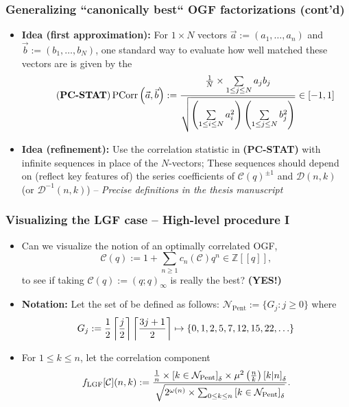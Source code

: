 \begin{frame}
\frametitle{Generalizing ``canonically best`` OGF factorizations (cont'd)}

\small
\begin{itemize} 

\item \textbf{Idea (first approximation):} For $1 \times N$ vectors $\vec{a} := (a_1, \ldots, a_n)$ and 
      $\vec{b} := (b_1, \ldots, b_N)$, one standard way to evaluate how well matched 
      these vectors are is given by the  
      \[
      \tag{\textbf{PC-STAT}}
      \operatorname{PCorr}\left(\vec{a}, \vec{b}\right) := 
           \frac{\frac{1}{N} \times \sum\limits_{1 \leq j \leq N} a_jb_j}{\sqrt{ 
	   \left(\sum\limits_{1 \leq i \leq N} a_i^2\right) \left(\sum\limits_{1 \leq j \leq N} b_j^2\right)}} \in [-1, 1]
      \]
\pause\item \textbf{Idea (refinement):} Use the correlation statistic in \textbf{(PC-STAT)} with infinite sequences 
      in place of the $N$-vectors; These sequences should depend on (reflect key features of) the 
      series coefficients of $\mathcal{C}(q)^{\pm 1}$ and $\mathcal{D}(n, k)$ (or $\mathcal{D}^{-1}(n, k)$) -- 
      \textit{Precise definitions in the thesis manuscript}

\end{itemize}

\end{frame}

\begin{frame}
\frametitle{Visualizing the LGF case -- High-level procedure I}
\begin{itemize} 

\item Can we visualize the notion of an optimally correlated OGF, 
      \[
      \mathcal{C}(q) := 1 + \sum_{n \geq 1} c_n(\mathcal{C}) q^n \in \mathbb{Z}[[q]], 
      \]
      to see if taking $\mathcal{C}(q) := (q; q)_{\infty}$ is really the best? 
      \textbf{(YES!)} 
\pause\item \textbf{Notation:} Let the set of  be defined as 
      follows: $\mathcal{N}_{\operatorname{Pent}} := \{G_j: j \geq 0\}$ where 
      $$G_j := \frac{1}{2} \left\lceil \frac{j}{2} \right\rceil \left\lceil \frac{3j+1}{2} \right\rceil \mapsto \{0, 1, 2, 5, 7, 12, 15, 22, \ldots\}$$
\pause\item For $1 \leq k \leq n$, let the correlation component 
      \[
      f_{\operatorname{LGF}}[\mathcal{C}](n, k) := 
           \frac{\frac{1}{n} \times \left[k \in \mathcal{N}_{\operatorname{Pent}}\right]_{\delta} \times 
	   \mu^2\left(\frac{n}{k}\right) \left[k|n\right]_{\delta}}{\sqrt{ 
	   2^{\omega(n)} \times \sum_{0 \leq k \leq n} \left[k \in \mathcal{N}_{\operatorname{Pent}}\right]_{\delta}}}. 
      \]

\end{itemize}

\end{frame}

